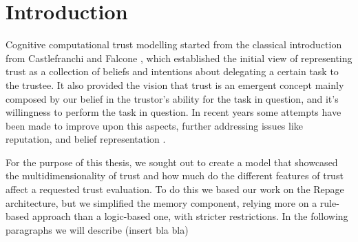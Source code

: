 \section{Introduction}
\label{sec:Introduction}
Cognitive computational trust modelling started from the classical introduction from Castlefranchi and Falcone \cite{Castelfranchi1998}, which established the initial view of representing trust as a collection of beliefs and intentions about delegating a certain task to the trustee. It also provided the vision that trust is an emergent concept mainly composed by our belief in the trustor's ability for the task in question, and it's willingness to perform the task in question. In recent years some attempts have been made to improve upon this aspects\cite{Piunti2012, Sutcliffe2012, Singh2011,Castelfranchi2010, Pinyol2009, Sabater2006, Neville2004}, further addressing issues like reputation\cite{Sabater2006}, and belief representation \cite{Pinyol2009, Piunti2012}.

For the purpose of this thesis, we sought out to create a model that showcased the multidimensionality of trust and how much do the different features of trust affect a requested trust evaluation. To do this we based our work on the Repage \cite{Sabater2006} architecture, but we simplified the memory component, relying more on a rule-based approach than a logic-based one, with stricter restrictions. In the following paragraphs we will describe (insert bla bla)
